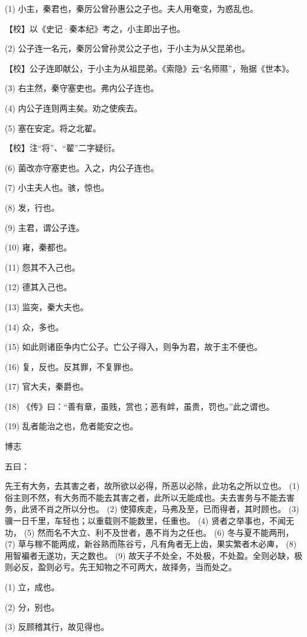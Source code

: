 \documentclass[12pt,UTF8]{ctexbook}
\begin{document}
(1) 小主，秦君也，秦厉公曾孙惠公之子也。夫人用奄变，为惑乱也。

【校】以《史记·秦本纪》考之，小主即出子也。

(2) 公子连一名元，秦厉公曾孙灵公之子也，于小主为从父昆弟也。

【校】公子连即献公，于小主为从祖昆弟。《索隐》云“名师隰”，殆据《世本》。

(3) 右主然，秦守塞吏也。弗内公子连也。

(4) 内公子连则两主矣。劝之使疾去。

(5) 塞在安定。将之北翟。

【校】注“将”、“翟”二字疑衍。

(6) 菌改亦守塞吏也。入之，内公子连也。

(7) 小主夫人也。骇，惊也。

(8) 发，行也。

(9) 主君，谓公子连。

(10) 雍，秦都也。

(11) 怨其不入己也。

(12) 德其入己也。

(13) 监突，秦大夫也。

(14) 众，多也。

(15) 如此则诸臣争内亡公子。亡公子得入，则争为君，故于主不便也。

(16) 复，反也。反其罪，不复罪也。

(17) 官大夫，秦爵也。

(18) 《传》曰：“善有章，虽贱，赏也；恶有衅，虽贵，罚也。”此之谓也。

(19) 乱者能治之也，危者能安之也。





博志


五曰：

先王有大务，去其害之者，故所欲以必得，所恶以必除，此功名之所以立也。 (1) 俗主则不然，有大务而不能去其害之者，此所以无能成也。夫去害务与不能去害务，此贤不肖之所以分也。 (2) 使獐疾走，马弗及至，已而得者，其时顾也。 (3) 骥一日千里，车轻也；以重载则不能数里，任重也。 (4) 贤者之举事也，不闻无功， (5) 然而名不大立、利不及世者，愚不肖为之任也。 (6) 冬与夏不能两刑， (7) 草与稼不能两成，新谷熟而陈谷亏，凡有角者无上齿，果实繁者木必庳， (8) 用智褊者无遂功，天之数也。 (9) 故天子不处全，不处极，不处盈。全则必缺，极则必反，盈则必亏。先王知物之不可两大，故择务，当而处之。

(1) 立，成也。

(2) 分，别也。

(3) 反顾稽其行，故见得也。
\end{document}
